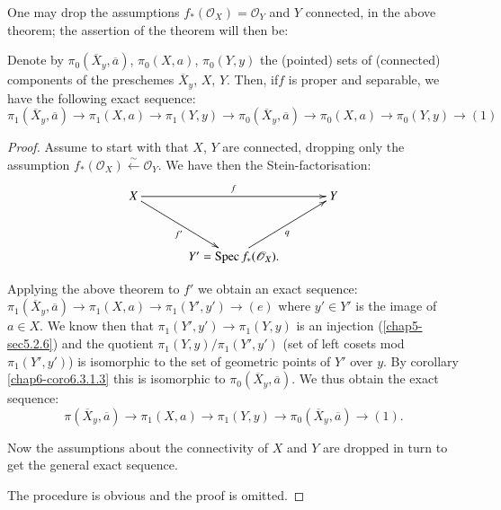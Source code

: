 \setcounter{subremark}{2}
\begin{subremark}\label{chap6-rem6.3.2.3}
One may drop the assumptions
$f_{\ast}(\mathscr{O}_{X})=\mathscr{O}_{Y}$ and $Y$ connected, in the
above theorem; the assertion of the theorem will then be:

Denote by $\pi_{0}(\overline{X}_{y},\overline{a})$, $\pi_{0}(X,a)$,
$\pi_{0}(Y,y)$ the (pointed) sets of (connected) components of the
preschemes $\overline{X}_{y}$, $X$, $Y$. Then, if\pageoriginale $f$ is
proper and separable, we have the following exact sequence:
{\fontsize{10pt}{12pt}\selectfont
\begin{equation*}
\pi_{1}(\overline{X}_{y},\overline{a})\to \pi_{1}(X,a)\to
\pi_{1}(Y,y)\to \pi_{0}(\overline{X}_{y},\overline{a})\to
\pi_{0}(X,a)\to \pi_{0}(Y,y)\to (1)
\end{equation*}}\relax
\end{subremark}

\begin{proof}
Assume to start with that $X$, $Y$ are connected, dropping only the
assumption
$f_{\ast}(\mathscr{O}_{X})\xleftarrow{\sim}\mathscr{O}_{Y}$. We have
then the Stein-factorisation:
\[
\xymatrix@=1.2cm{
X\ar[rr]^{f}\ar[dr]_{f'} && Y\\
  & Y'=\Spec f_{\ast}(\mathscr{O}_{X}).\ar[ur]_{q}
}
\]

Applying the above theorem to $f'$ we obtain an exact sequence:
$\pi_{1}(\overline{X}_{y},\overline{a})\to \pi_{1}(X,a)\to
\pi_{1}(Y',y')\to (e)$ where $y'\in Y'$ is the image of $a\in X$. We
know then that $\pi_{1}(Y',y')\to \pi_{1}(Y,y)$ is an injection
(\ref{chap5-sec5.2.6}) and the quotient $\pi_{1}(Y,y)/\pi_{1}(Y',y')$ (set
of left cosets mod $\pi_{1}(Y',y')$) is isomorphic to the set of
geometric points of $Y'$ over $y$. By corollary \ref{chap6-coro6.3.1.3} this
is isomorphic to $\pi_{0}(\overline{X}_{y},\overline{a})$. We thus
obtain the exact sequence:
$$
\pi(\overline{X}_{y},\overline{a})\to \pi_{1}(X,a)\to \pi_{1}(Y,y)\to
\pi_{0}(\overline{X}_{y},\overline{a})\to (1).
$$

Now the assumptions about the connectivity of $X$ and $Y$ are dropped
in turn to get the general exact sequence.

The procedure is obvious and the proof is omitted.
\end{proof}
